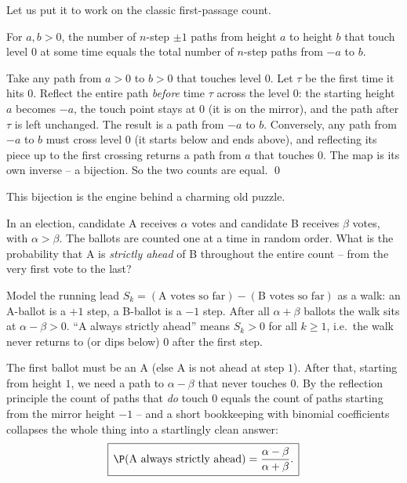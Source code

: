 Let us put it to work on the classic first-passage count.

\begin{theorem}
\label{ch26:thm-reflection}
For $a, b > 0$, the number of $n$-step $\pm 1$ paths from height $a$ to height
$b$ that touch level $0$ at some time equals the total number of $n$-step paths
from $-a$ to $b$.
\end{theorem}

\begin{whybox}
Take any path from $a > 0$ to $b > 0$ that touches level $0$. Let $\tau$ be the
first time it hits $0$. Reflect the entire path \emph{before} time $\tau$ across
the level $0$: the starting height $a$ becomes $-a$, the touch point stays at
$0$ (it is on the mirror), and the path after $\tau$ is left unchanged. The
result is a path from $-a$ to $b$. Conversely, any path from $-a$ to $b$ must
cross level $0$ (it starts below and ends above), and reflecting its piece up
to the first crossing returns a path from $a$ that touches $0$. The map is its
own inverse -- a bijection. So the two counts are equal. \qed
\end{whybox}

This bijection is the engine behind a charming old puzzle.

\begin{example}
\label{ch26:ex-ballotworked}
In an election, candidate A receives $\alpha$ votes and candidate B receives
$\beta$ votes, with $\alpha > \beta$. The ballots are counted one at a time in
random order. What is the probability that A is \emph{strictly ahead} of B
throughout the entire count -- from the very first vote to the last?

Model the running lead $S_k = (\text{A votes so far}) - (\text{B votes so
far})$ as a walk: an A-ballot is a $+1$ step, a B-ballot is a $-1$ step. After
all $\alpha + \beta$ ballots the walk sits at $\alpha - \beta > 0$. ``A always
strictly ahead'' means $S_k > 0$ for all $k \ge 1$, i.e.\ the walk never
returns to (or dips below) $0$ after the first step.

The first ballot must be an A (else A is not ahead at step $1$). After that,
starting from height $1$, we need a path to $\alpha - \beta$ that never touches
$0$. By the reflection principle the count of paths that \emph{do} touch $0$
equals the count of paths starting from the mirror height $-1$ -- and a short
bookkeeping with binomial coefficients collapses the whole thing into a
startlingly clean answer:
\[
  \boxed{\,\P(\text{A always strictly ahead}) = \frac{\alpha - \beta}{\alpha + \beta}.\,}
\]
\end{example}

